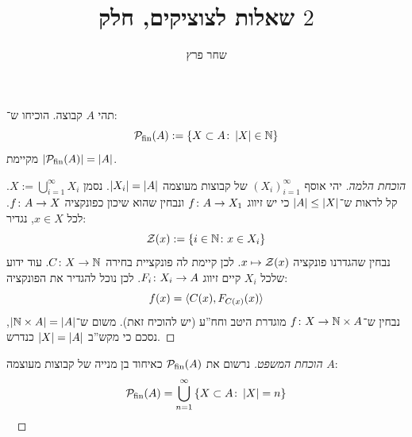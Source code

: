 \documentclass[]{../../../../tex/classes/styledArticle}
\author{שחר פרץ}
\title{שאלות לצוציקים, חלק $2$}
\newcommand\pfin{\ps_{\mathrm{fin}}}
\begin{document}
	\maketitle
	
	\begin{Theorem}
		תהי $A$ קבוצה. הוכיחו ש־: 
		\[ \pfin (A) := \ccb{X \subset A \co \sof{X} \in \N} \]
		מקיימת $\sof{\pfin(A)} = \sof A$. 
	\end{Theorem}
	\begin{proof}[הוכחת הלמה]
		יהי אוסף $(X_i)_{i =1}^{\infty}$ של קבוצות מעוצמה $\left \lvert X_i \right \rvert = \left \lvert A \right \rvert$. נסמן $X := \bigcup_{i = 1}^{\infty}X_i$. קל לראות ש־$\left \lvert A \right \rvert \le \left \lvert X \right \rvert$ כי יש זיווג $f \colon A \to X_1$ ונבחין שהוא שיכון כפונקציה $f \colon A \to X$. 
		לכל $x \in X$, נגדיר: 
		\[ \mathcal{Z}(x) := \left \{ i \in \mathbb{N} \colon x \in X_i \right \} \]
		נבחין שהגדרנו פונקציה $x \mapsto \mathcal{Z}(x)$. לכן קיימת לה פונקציית בחירה $C \colon X \to \mathbb{N}$. עוד ידוע שלכל $X_i$ קיים זיווג $F_i \colon X_i \to A$. לכן נוכל להגדיר את הפונקציה: 
		\[ f(x) = \langle C(x), F_{C(x)}(x) \rangle \]
		נבחין ש־$f \colon X \to \mathbb{N} \times A$ מוגדרת היטב וחח''ע (יש להוכיח זאת). משום ש־$\left \lvert \mathbb{N} \times A \right \rvert = \left \lvert A \right \rvert$, נסכם כי מקש''ב $\left \lvert X \right \rvert = \left \lvert A \right \rvert$ כנדרש. 
	\end{proof}
	\begin{proof}[הוכחת המשפט]
		נרשום את $\pfin(A)$ כאיחוד בן מנייה של קבוצות מעוצמה $A$: 
		\[ \pfin(A) = \bigcup_{n =1}^{\infty}\ccb{X \subset A \co \sof{X} = n} \]\
	\end{proof}
	
	\ndoc
\end{document}
